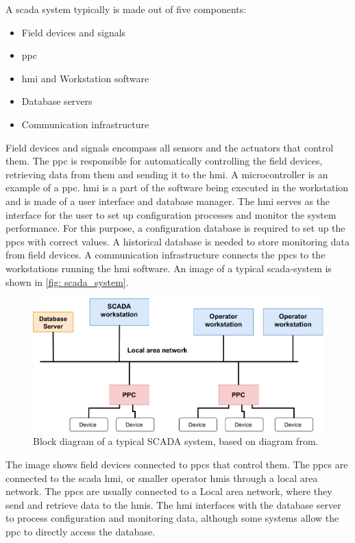\documentclass[main.tex]{subfiles}
\begin{document}
A \gls{scada} system typically is made out of five components:

\begin{itemize}
    \item Field devices and signals
    \item \acrfull{ppc}
    \item \acrfull{hmi} and Workstation software
    \item Database servers
    \item Communication infrastructure
\end{itemize}

Field devices and signals encompass all sensors and the actuators that control them. The \gls{ppc} is responsible for automatically controlling the field devices, retrieving data from them and sending it to the \gls{hmi}. A microcontroller is an example of a \gls{ppc}. \gls{hmi} is a part of the software being executed in the workstation and is made of a user interface and database manager. The \gls{hmi} serves as the interface for the user to set up configuration processes and monitor the system performance. For this purpose, a configuration database is required to set up the \gls{ppc}s with correct values. A historical database is needed to store monitoring data from field devices. A communication infrastructure connects the \gls{ppc}s to the workstations running the  \gls{hmi} software. An image of a typical \gls{scada}-system is shown in \autoref{fig: scada_system}.

\begin{figure}[!ht]
    \centering
    \includegraphics[scale=0.6]{images/scada_system.pdf}
    \caption{Block diagram of a typical SCADA system, based on diagram from\cite{scada_design}.}
    \label{fig: scada_system}
\end{figure}
\FloatBarrier

The image shows field devices connected to \gls{ppc}s that control them. The \gls{ppc}s are connected to the \gls{scada} \gls{hmi}, or smaller operator \gls{hmi}s through a local area network. The \gls{ppc}s are usually connected to a Local area network, where they send and retrieve data to the  \gls{hmi}s. The \gls{hmi} interfaces with the database server to process configuration and monitoring data, although some systems allow the \gls{ppc} to directly access the database.
\end{document}
